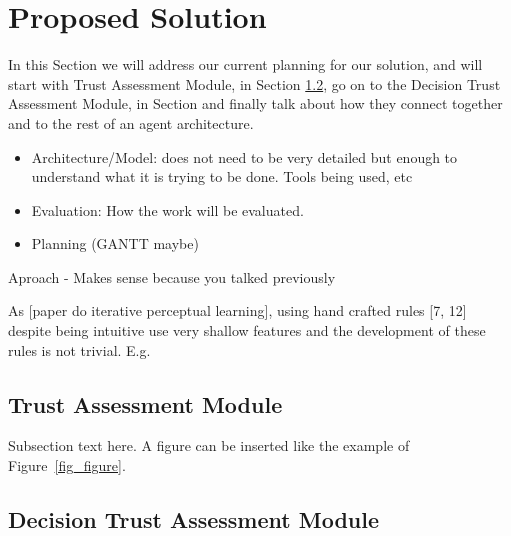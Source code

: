 \section{Proposed Solution}
\label{sec:Solution}
In this Section we will address our current planning for our solution, and will start with Trust Assessment Module, in Section \ref{subsec:Solution:Trust Assessment Module}, go on to the Decision Trust Assessment Module, in Section and finally talk about how they connect together and to the rest of an agent architecture.



\begin{itemize}
	\item Architecture/Model: does not need to be very detailed but enough to understand what it is trying to be done. Tools being used, etc
	\item Evaluation: How the work will be evaluated.	
	\item Planning (GANTT maybe)	
\end{itemize}Aproach - Makes sense because you talked previously


As [paper do iterative perceptual learning], using hand crafted rules [7, 12] despite being intuitive use very shallow features and the development of these rules is not trivial.
E.g.

\subsection{Trust Assessment Module}
\label{subsec:Solution:Trust Assessment Module}
Subsection text here.
A figure can be inserted like the example of Figure~\ref{fig_figure}.


\subsection{Decision Trust Assessment Module}
\label{subsec:Solution:Trust Assessment Module}